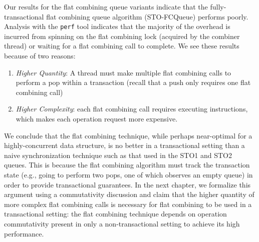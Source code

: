 Our results for the flat combining queue variants indicate that the fully-transactional flat combining queue algorithm (STO-FCQueue) performs poorly. Analysis with the \texttt{perf} tool indicates that the majority of the overhead is incurred from spinning on the flat combining lock (acquired by the combiner thread) or waiting for a flat combining call to complete. We see these results because of two reasons:
\begin{enumerate}
\item \emph{Higher Quantity}: A thread must make multiple flat combining calls to perform a pop within a transaction (recall that a push only requires one flat combining call) 
\item \emph{Higher Complexity}: each flat combining call requires executing instructions, which makes each operation request more expensive.
\end{enumerate}

We conclude that the flat combining technique, while perhaps near-optimal for a highly-concurrent data structure, is no better in a transactional setting than a naive synchronization technique such as that used in the STO1 and STO2 queues. This is because the flat combining algorithm must track the transaction state (e.g., going to perform two pops, one of which observes an empty queue) in order to provide transactional guarantees. In the next chapter, we formalize this argument using a commutativity discussion and claim that the higher quantity of more complex flat combining calls is necessary for flat combining to be used in a transactional setting: the flat combining technique depends on operation commutativity present in only a non-transactional setting to achieve its high performance. 
